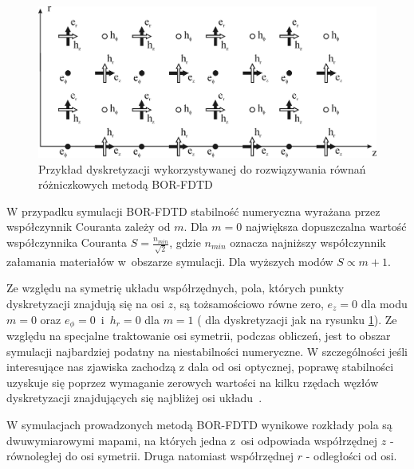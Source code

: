 \begin{figure}[htb]
	\includegraphics[width=\textwidth]{subart/fdtd/R5_TFSF.png}
	\caption{Przykład dyskretyzacji wykorzystywanej do rozwiązywania równań różniczkowych metodą BOR-FDTD \cite{antosiewicz2009wplyw}}
	\label{fig:bor-dysk}
\end{figure}
W przypadku symulacji BOR-FDTD stabilność numeryczna wyrażana przez współczynnik Couranta zależy od $m$. Dla $m=0$ największa dopuszczalna wartość współczynnika Couranta $S=\frac{n_{min}}{\sqrt{2}}$, gdzie $n_{min}$ oznacza najniższy współczynnik załamania materiałów w~obszarze symulacji. Dla wyższych modów $S \propto m+1$. 

Ze względu na symetrię układu współrzędnych, pola, których punkty dyskretyzacji znajdują się na osi $z$, są tożsamościowo równe zero, $e_z=0$ dla modu $m=0$ oraz $e_{\phi}=0$~i~$h_r=0$ dla $m=1$ ( dla dyskretyzacji jak na rysunku \ref{fig:bor-dysk}). Ze względu na specjalne traktowanie osi symetrii, podczas obliczeń, jest to obszar symulacji najbardziej podatny na niestabilności numeryczne. W szczególności jeśli interesujące nas zjawiska zachodzą z dala od osi optycznej, poprawę stabilności uzyskuje się poprzez wymaganie zerowych wartości na kilku rzędach węzłów dyskretyzacji znajdujących się najbliżej osi układu~\cite{OskooiRo10}.

W symulacjach prowadzonych metodą BOR-FDTD wynikowe rozkłady pola są dwuwymiarowymi mapami, na których jedna z~osi odpowiada współrzędnej $z$ - równoległej do osi symetrii. Druga natomiast współrzędnej $r$ - odległości od osi. 
